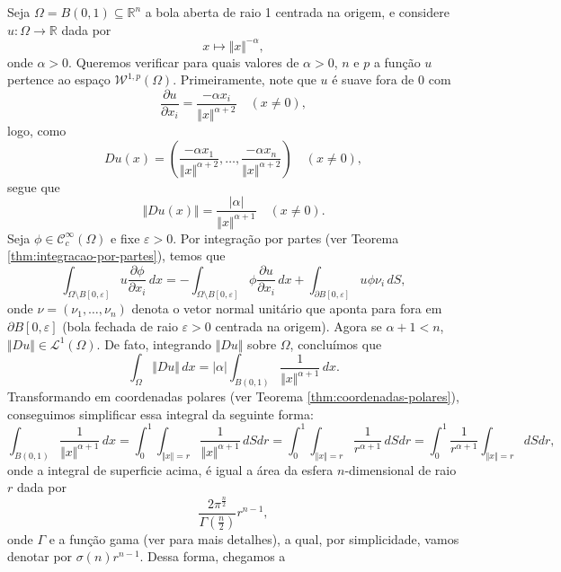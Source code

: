 \documentclass[a4paper, 11pt]{book}
\theoremstyle{definition}
\newcommand{\bR}{\mathbb{R}}
\newcommand{\cC}{\mathcal{C}}
\newcommand{\cL}{\mathcal{L}}
\newcommand{\cW}{\mathcal{W}}
\begin{document}
\begin{ex}
    Seja $\Omega = B(0,1) \subseteq \bR^n$ a bola aberta de raio 1 centrada na origem, e considere $u : \Omega \to \bR$ dada por
    \begin{equation} \label{eq:po}
        x \mapsto \Vert x \Vert^{-\alpha},
    \end{equation}
    onde $\alpha > 0$. Queremos verificar para quais valores de $\alpha > 0$, $n$ e $p$ a função $u$ pertence ao espaço $\cW^{1,p}(\Omega)$.
    Primeiramente, note que $u$ é suave fora de $0$ com
    \[
        \dfrac{\partial u}{\partial x_i} = \frac{-\alpha x_i}{\Vert x \Vert^{\alpha + 2}} \quad (x \neq 0),
    \]
    logo, como
    \[
        Du(x) = \left(\frac{-\alpha x_1}{\Vert x \Vert^{\alpha + 2}},\dots,\frac{-\alpha x_n}{\Vert x \Vert^{\alpha + 2}}  \right) \quad (x \neq 0),
    \]
    segue que
    \[
        \Vert Du(x) \Vert = \frac{|\alpha|}{\Vert x \Vert^{\alpha + 1}} \quad (x \neq 0).
    \]
    Seja $\phi \in \cC^\infty_c(\Omega)$ e fixe $\varepsilon > 0$. Por integração por partes (ver Teorema \ref{thm:integracao-por-partes}), temos que
    \begin{equation} \label{eq:op}
        \int_{\Omega \setminus B[0, \varepsilon]} u \dfrac{\partial \phi}{\partial x_i} \, dx = -\int_{\Omega \setminus B[0, \varepsilon]} \phi \dfrac{\partial u}{\partial x_i} \,dx + \int_{\partial B[0,\varepsilon]} u \phi \nu_i \,dS,
    \end{equation}
    onde $\nu = (\nu_1,\dots,\nu_n)$ denota o vetor normal unitário que aponta para fora em $\partial B[0,\varepsilon]$ (bola fechada de raio $\varepsilon > 0  $ centrada na origem).
    Agora se $\alpha + 1 < n$, $\Vert Du \Vert \in \cL^1(\Omega)$.
    De fato, integrando $\Vert Du \Vert$ sobre $\Omega$, concluímos que
    \[
        \int_\Omega \Vert Du \Vert \,dx = |\alpha|\int_{B(0,1)} \frac{1}{\Vert x \Vert^{\alpha+1}} \,dx.
    \]
    Transformando em coordenadas polares (ver Teorema \ref{thm:coordenadas-polares}), conseguimos simplificar essa integral da seguinte forma:
    \[
        \int_{B(0,1)} \frac{1}{\Vert x \Vert^{\alpha+1}} \,dx =  \int_0^1 \int_{\Vert x \Vert = r} \frac{1}{\Vert x \Vert^{\alpha + 1}} \,dS dr = \int_0^1 \int_{\Vert x \Vert= r} \frac{1}{r^{\alpha + 1}} \, dS dr = \int_0^1 \frac{1}{r^{\alpha+1}}  \int_{\Vert x \Vert = r} dS dr,
    \]
    onde a integral de superficie acima, é igual a área da esfera $n$-dimensional de raio $r$ dada por
    \[
        \frac{2\pi^{\frac{n}{2}}}{\Gamma(\frac{n}{2})}r^{n-1},
    \]
    onde $\Gamma$ e a função gama (ver \cite{artin-gamma} para mais detalhes), a qual, por simplicidade, vamos denotar por $\sigma(n) r^{n-1}$. Dessa forma, chegamos a

\end{ex}
\end{document}
